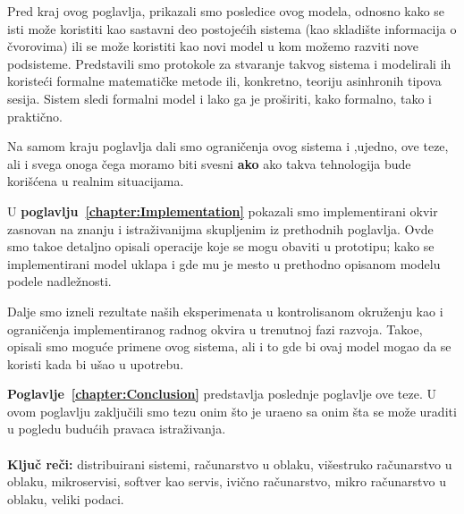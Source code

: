 Pred kraj ovog poglavlja, prikazali smo posledice ovog modela, odnosno kako se isti mo\v ze koristiti kao sastavni deo postoje\'cih sistema (kao skladi\v ste informacija o \v cvorovima) ili se mo\v ze koristiti kao novi model u kom mo\v zemo razviti nove podsisteme. Predstavili smo protokole za stvaranje takvog sistema i modelirali ih koriste\'ci formalne matemati\v cke metode ili, konkretno, teoriju asinhronih tipova sesija. Sistem sledi formalni model i lako ga je pro\v siriti, kako formalno, tako i prakti\v cno.

Na samom kraju poglavlja dali smo ograni\v cenja ovog sistema i ,ujedno, ove teze, ali i svega onoga \v cega moramo biti svesni \textbf{ako} ako takva tehnologija bude kori\v s\'cena u realnim situacijama.

U \textbf{poglavlju~\ref{chapter:Implementation}} pokazali smo implementirani okvir zasnovan na znanju i istra\v zivanijma skupljenim iz prethodnih poglavlja. Ovde smo tako\dj e detaljno opisali operacije koje se mogu obaviti u prototipu; kako se implementirani model uklapa i gde mu je mesto u prethodno opisanom modelu podele nadle\v znosti.

Dalje smo izneli rezultate na\v sih eksperimenata u kontrolisanom okru\v zenju kao i ograni\v cenja implementiranog radnog okvira u trenutnoj fazi razvoja. Tako\dj e, opisali smo mogu\'ce primene ovog sistema, ali i to gde bi ovaj model mogao da se koristi kada bi u\v sao u upotrebu.

\textbf{Poglavlje~\ref{chapter:Conclusion}} predstavlja poslednje poglavlje ove teze. U ovom poglavlju zaklju\v cili smo tezu onim \v sto je ura\dj eno sa onim \v sta se mo\v ze uraditi u pogledu budu\'cih pravaca istra\v zivanja.\\\\

\noindent
\textbf{Klju\v c re\v ci:} distribuirani sistemi, ra\v cunarstvo u oblaku, vi\v sestruko ra\v cunarstvo u oblaku, mikroservisi, softver kao servis, ivi\v cno ra\v cunarstvo, mikro ra\v cunarstvo u oblaku, veliki podaci.